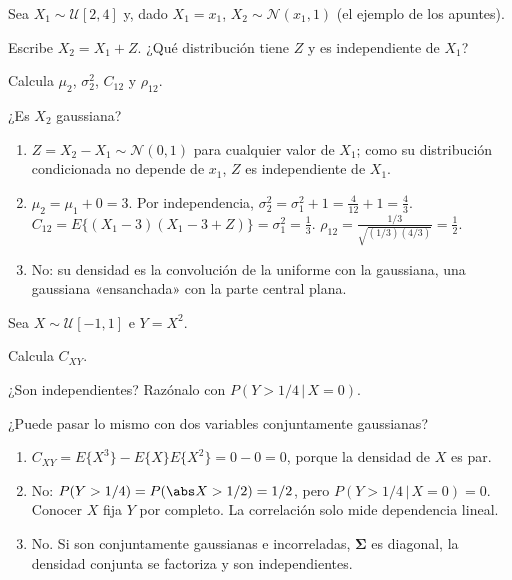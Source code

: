 \documentclass[11pt,a4paper]{scrartcl}
\begin{document}
\begin{ejercicio}
  Sea $X_1\sim\mathcal U[2,4]$ y, dado $X_1=x_1$, $X_2\sim\mathcal N(x_1,1)$ (el ejemplo de los apuntes).
  \begin{incisos}[1]
    \item Escribe $X_2=X_1+Z$. ¿Qué distribución tiene $Z$ y es independiente de $X_1$?
    \item Calcula $\mu_2$, $\sigma_2^2$, $C_{12}$ y $\rho_{12}$.
    \item ¿Es $X_2$ gaussiana?
  \end{incisos}
\end{ejercicio}
\begin{solucion}
  \begin{enumerate}[label=\alph*)]
    \item $Z=X_2-X_1\sim\mathcal N(0,1)$ para cualquier valor de $X_1$; como su distribución condicionada no depende de $x_1$, $Z$ es independiente de $X_1$.
    \item $\mu_2=\mu_1+0=3$. Por independencia, $\sigma_2^2=\sigma_1^2+1=\frac{4}{12}+1=\frac43$. $C_{12}=E\{(X_1-3)(X_1-3+Z)\}=\sigma_1^2=\frac13$. $\rho_{12}=\frac{1/3}{\sqrt{(1/3)(4/3)}}=\frac12$.
    \item No: su densidad es la convolución de la uniforme con la gaussiana, una gaussiana «ensanchada» con la parte central plana.
  \end{enumerate}
\end{solucion}

\begin{ejercicio}
  Sea $X\sim\mathcal U[-1,1]$ e $Y=X^2$.
  \begin{incisos}[1]
    \item Calcula $C_{XY}$.
    \item ¿Son independientes? Razónalo con $P(Y>1/4\,|\,X=0)$.
    \item ¿Puede pasar lo mismo con dos variables conjuntamente gaussianas?
  \end{incisos}
\end{ejercicio}
\begin{solucion}
  \begin{enumerate}[label=\alph*)]
    \item $C_{XY}=E\{X^3\}-E\{X\}E\{X^2\}=0-0=0$, porque la densidad de $X$ es par.
    \item No: $P(Y>1/4)=P(\abs X>1/2)=1/2$, pero $P(Y>1/4\,|\,X=0)=0$. Conocer $X$ fija $Y$ por completo. La correlación solo mide dependencia lineal.
    \item No. Si son conjuntamente gaussianas e incorreladas, $\boldsymbol\Sigma$ es diagonal, la densidad conjunta se factoriza y son independientes.
  \end{enumerate}
\end{solucion}
\end{document}
